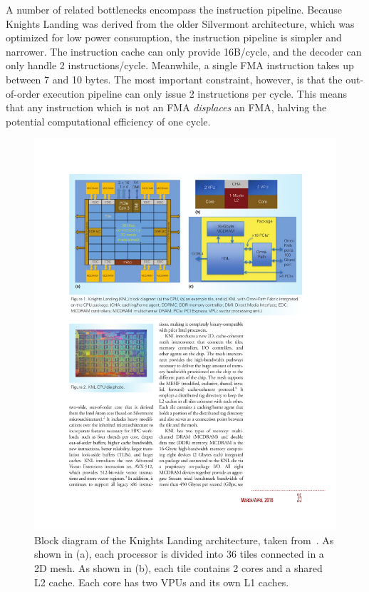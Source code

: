 A number of related bottlenecks encompass the instruction pipeline. Because Knights Landing was derived from the older Silvermont architecture, which was optimized for low power consumption, the instruction pipeline is simpler and narrower. The instruction cache can only provide 16B/cycle, and the decoder can only handle 2 instructions/cycle. Meanwhile, a single \gls{FMA} instruction takes up between 7 and 10 bytes. The most important constraint, however, is that the out-of-order execution pipeline can only issue 2 instructions per cycle. This means that any instruction which is not an FMA \emph{displaces} an FMA, halving the potential computational efficiency of one cycle.


\begin{figure}[tb]
\centering
\includegraphics[width=\textwidth]{images/knl_arch.pdf}
\caption{Block diagram of the Knights Landing architecture, taken from~\cite{Sodani:2016:KLS:2927511.2927563}. As shown in (a), each processor is divided into 36 tiles connected in a 2D mesh. As shown in (b), each tile contains 2 cores and a shared L2 cache. Each core has two VPUs and its own L1 caches.}
\end{figure}

